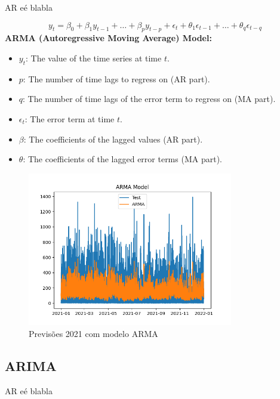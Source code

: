 AR eé blabla

\begin{equation} \label{eq:ARMA}  y_t = \beta_0 + \beta_1 y_{t-1} + \dots + \beta_p y_{t-p} + \epsilon_t + \theta_1 \epsilon_{t-1} + \dots + \theta_q \epsilon_{t-q}  \end{equation}
\textbf{ARMA (Autoregressive Moving Average) Model:}
\begin{itemize}
  \item{$y_t$: The value of the time series at time $t$.}
  \item $p$: The number of time lags to regress on (AR part).
  \item $q$: The number of time lags of the error term to regress on (MA part).
  \item $\epsilon_t$: The error term at time $t$.
  \item $\beta$: The coefficients of the lagged values (AR part).
  \item $\theta$: The coefficients of the lagged error terms (MA part).
\end{itemize}


\begin{figure}[H]
    \centering
    \includegraphics[width=0.8\textwidth]{../plots/ARMA_model.png}
    \caption{Previsões 2021 com modelo ARMA}
    \label{fig:ARMA_model}
\end{figure}

\subsection{ARIMA}

AR eé blabla

